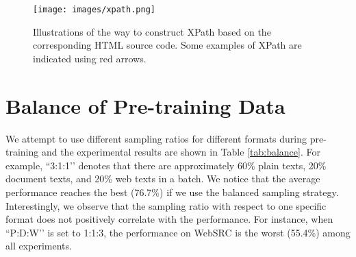 \documentclass[11pt]{article}
\begin{document}
\begin{figure}[ht]
    \centering
    \texttt{[image: images/xpath.png]}
    \caption{Illustrations of the way to construct XPath based on the corresponding HTML source code. Some examples of XPath are indicated using red arrows.}
    \label{fig:xpath}
\end{figure}



\section{Balance of Pre-training Data} 
\label{sec:balance}
We attempt to use different sampling ratios for different formats during pre-training and the experimental results are shown in Table \ref{tab:balance}. For example, ``3:1:1’’ denotes that there are approximately 60\% plain texts, 20\% document texts, and 20\% web texts in a batch. We notice that the average performance reaches the best (76.7\%) if we use the balanced sampling strategy. Interestingly, we observe that the sampling ratio with respect to one specific format does not positively correlate with the performance. For instance, when ``P:D:W’’ is set to 1:1:3, the performance on WebSRC is the worst (55.4\%) among all experiments. 


\begin{table}[h]
\centering
{}
\caption{Results on the balance of pre-training datasets. P:D:W denotes the ratio of plain, document, and web texts in a batch, respectively.}
\label{tab:balance}
\end{table}
\end{document}
